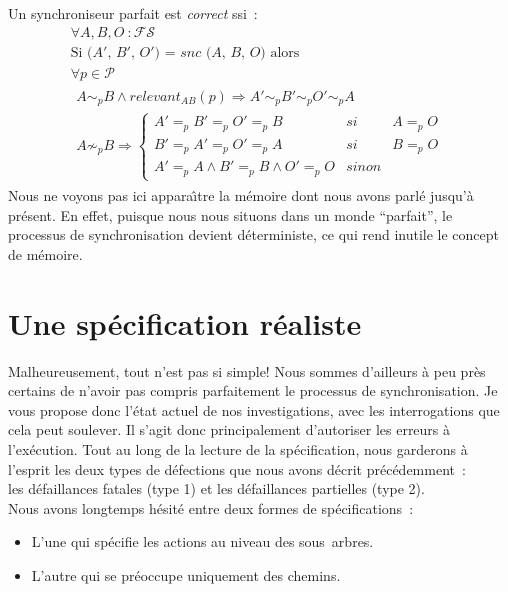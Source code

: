 \documentclass[11pt]{report}
\newcommand{\fs}{\ensuremath{\mathcal{FS}}}
\newcommand{\path}{\ensuremath{\mathcal{P}}}
\begin{document}
{Un synchroniseur parfait est \emph{correct} ssi~:
\[
\begin{array}{l}
\forall A, B, O~: \fs\ \\
\mbox{Si ($A'$, $B'$, $O'$) = $\mathit{snc}$ ($A$, $B$, $O$) alors}\\
\forall p \in \path\ \\
\begin{array}{ll}
 A \sim_{p} B \wedge \mathit{relevant}_{AB}(p) 
\Rightarrow A' \sim_{p} B' \sim_{p} O' \sim_{p} A\\
 A \not\sim_{p} B \Rightarrow 
  \left\{
   \begin{array}{lll} 
    A' =_{p} B' =_{p} O' =_{p} B & si & A =_{p} O \\
    B' =_{p} A' =_{p} O' =_{p} A & si & B =_{p} O \\
    A' =_{p} A \wedge B' =_{p} B \wedge O' =_{p} O & sinon &
   \end{array} 
  \right.
 \end{array}
\end{array}
\]
Nous ne voyons pas ici appara\^{\i}tre la m\'emoire dont nous avons parl\'e
jusqu'\`a pr\'esent. En effet, puisque nous nous situons dans un monde
``parfait'', le processus de synchronisation devient d\'eterministe, ce
qui rend inutile le concept de m\'emoire.
        \section{Une sp\'ecification r\'ealiste}
\label{specglob}
Malheureusement, tout n'est pas si simple! Nous sommes d'ailleurs \`a peu pr\`es
certains de n'avoir pas compris parfaitement le processus de synchronisation.
Je vous propose donc l'\'etat actuel de nos investigations, avec les
interrogations que cela peut soulever.
Il s'agit donc principalement d'autoriser les erreurs \`a l'ex\'ecution.
Tout au long de la lecture de la sp\'ecification, nous garderons \`a
l'esprit les deux types de d\'efections que nous avons d\'ecrit pr\'ec\'edemment~:\\
les d\'efaillances fatales (type 1) et les d\'efaillances partielles (type 2).\\
Nous avons longtemps h\'esit\'e entre deux formes de sp\'ecifications~:
\begin{itemize}
\item L'une qui sp\'ecifie les actions au niveau des sous~arbres.
\item L'autre qui se pr\'eoccupe uniquement des chemins.
\end{itemize}
}
\end{document}
